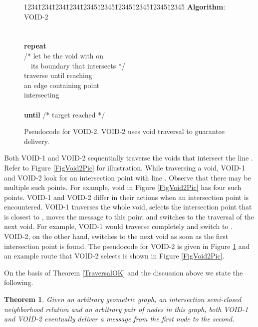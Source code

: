 \documentclass[conference]{IEEEtran}
\newtheorem{theorem}{Theorem}
\begin{document}
\begin{figure}[h]
\begin{tabbing}
1234\=1234\=1234\=1234\=12345\=12345\=12345\=12345\=12345\=12345\=\kill
\textbf{Algorithm}: VOID-2 \\
\> \\
\> \\
\>\textbf{repeat} \\
\>\>/* let  be the void with  on  \\
\>\> \ \  its boundary that intersects  */\\
\>\>traverse  until reaching      \\
\>\>an edge containing point   \\
\>\>intersecting  \\
\>\> \\
\>\textbf{until}  /* target reached */ \\
\end{tabbing}
\caption{Pseudocode for VOID-2. VOID-2 uses void 
         traversal to guarantee delivery.}
\label{FigVoid2Alg}
\end{figure}


Both VOID-1 and VOID-2 sequentially traverse the voids that intersect
the line . Refer to Figure \ref{FigVoid2Pic} for illustration.
While traversing a void, VOID-1 and VOID-2 look for an intersection
point with line . Observe that there may be multiple such
points. For example, void  in Figure \ref{FigVoid2Pic} has four
such points. VOID-1 and VOID-2 differ in their actions when an
intersection point is encountered. VOID-1 traverses the whole void,
selects the intersection point that is closest to , moves the
message to this point and switches to the traversal of the next
void. For example, VOID-1 would traverse  completely and switch
to . VOID-2, on the other hand, switches to the next void as soon
as the first intersection point is found. The pseudocode for VOID-2 is
given in Figure \ref{FigVoid2Alg} and an example route that VOID-2
selects is shown in Figure \ref{FigVoid2Pic}.

On the basis of Theorem \ref{TraversalOK} and the discussion above
we state the following.

\begin{theorem}\label{VoidsOK}
Given an arbitrary geometric graph, an intersection semi-closed
neighborhood relation and an arbitrary pair of nodes in this graph,
both VOID-1 and VOID-2 eventually deliver a message from the first
node to the second.
\end{theorem}
\end{document}
